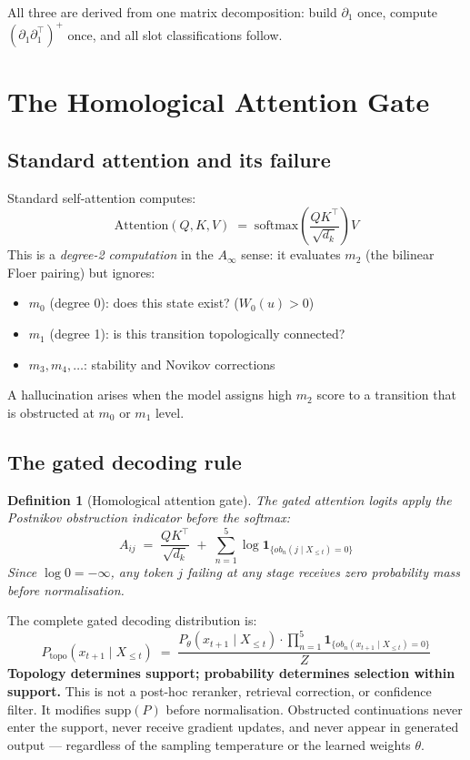 \documentclass[11pt,a4paper]{article}
\newtheorem{definition}[theorem]{Definition}
\begin{document}
All three are derived from one matrix decomposition: build
$\partial_1$ once, compute $(\partial_1\partial_1^\top)^+$ once,
and all slot classifications follow.

\section{The Homological Attention Gate}

\subsection{Standard attention and its failure}

Standard self-attention computes:
\[
  \mathrm{Attention}(Q,K,V)
  \;=\; \mathrm{softmax}\!\left(\frac{QK^\top}{\sqrt{d_k}}\right) V
\]
This is a \emph{degree-2 computation} in the $A_\infty$ sense:
it evaluates $m_2$ (the bilinear Floer pairing) but ignores:
\begin{itemize}
  \item $m_0$ (degree 0): does this state exist? ($W_0(u) > 0$)
  \item $m_1$ (degree 1): is this transition topologically connected?
  \item $m_3, m_4, \ldots$: stability and Novikov corrections
\end{itemize}
A hallucination arises when the model assigns high $m_2$ score
to a transition that is obstructed at $m_0$ or $m_1$ level.

\subsection{The gated decoding rule}

\begin{definition}[Homological attention gate]
The gated attention logits apply the Postnikov obstruction
indicator before the softmax:
\[
  A_{ij} \;=\; \frac{QK^\top}{\sqrt{d_k}} \;+\;
  \sum_{n=1}^{5}\log\mathbf{1}_{\{ob_n(j\mid X_{\leq t})=0\}}
\]
Since $\log 0 = -\infty$, any token $j$ failing at any stage
receives zero probability mass before normalisation.
\end{definition}

The complete gated decoding distribution is:
\[
\boxed{
  P_{\mathrm{topo}}(x_{t+1} \mid X_{\leq t})
  \;=\;
  \frac{P_\theta(x_{t+1} \mid X_{\leq t})
    \cdot\prod_{n=1}^{5}\mathbf{1}_{\{ob_n(x_{t+1}\mid X_{\leq t})=0\}}}
       {Z}
}
\]
\textbf{Topology determines support; probability determines selection
within support.}
This is not a post-hoc reranker, retrieval correction, or confidence
filter. It modifies $\mathrm{supp}(P)$ before normalisation.
Obstructed continuations never enter the support, never receive
gradient updates, and never appear in generated output ---
regardless of the sampling temperature or the learned weights $\theta$.
\end{document}
